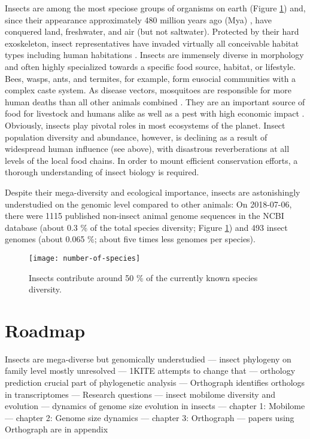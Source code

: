 Insects are among the most speciose groups of organisms on earth (Figure
\ref{fig:biodiversity}) and, since their appearance approximately 480
million years ago (Mya) \citep{Misof2014}, have conquered land,
freshwater, and air (but not saltwater). Protected by their hard
exoskeleton, insect representatives have invaded virtually all
conceivable habitat types including human habitations
\citep{Bertone2016}. Insects are immensely diverse in morphology
\citep{Grimaldi2005} and often highly specialized towards a specific
food source, habitat, or lifestyle. Bees, wasps, ants, and termites, for
example, form eusocial communities with a complex caste system. As
disease vectors, mosquitoes are responsible for more human deaths than
all other animals combined \citep{WHO2017, Linnell2011, Lamarque2009,
DeMaddalena2008, Kasturiratne2008, Packer2005}. They are an important
source of food for livestock and humans alike as well as a pest with
high economic impact \citep{Oliveira2014}. Obviously, insects play
pivotal roles in most ecosystems of the planet. Insect population
diversity and abundance, however, is declining \citep{Vogel2017} as a
result of widespread human influence (see above), with disastrous
reverberations at all levels of the local food chains. In order to mount
efficient conservation efforts, a thorough understanding of insect
biology is required.

Despite their mega-diversity and ecological importance, insects are
astonishingly understudied on the genomic level compared to other
animals: On 2018-07-06, there were 1115 published non-insect animal
genome sequences in the NCBI database (about 0.3 \% of the total species
diversity; Figure \ref{fig:biodiversity}) and 493 insect genomes (about
0.065 \%; about five times less genomes per species).

\begin{figure}
\centering
\texttt{[image: number-of-species]}
\caption{Insects contribute around 50 \% of the currently known species
diversity.}
\label{fig:biodiversity}
\end{figure}

\section{Roadmap}

Insects are mega-diverse but genomically understudied --- insect
phylogeny on family level mostly unresolved --- 1KITE attempts to change
that --- orthology prediction crucial part of phylogenetic analysis ---
Orthograph identifies orthologs in transcriptomes --- Research questions
--- insect mobilome diversity and evolution --- dynamics of genome size
evolution in insects --- chapter 1: Mobilome --- chapter 2: Genome size
dynamics --- chapter 3: Orthograph --- papers using Orthograph are in
appendix
